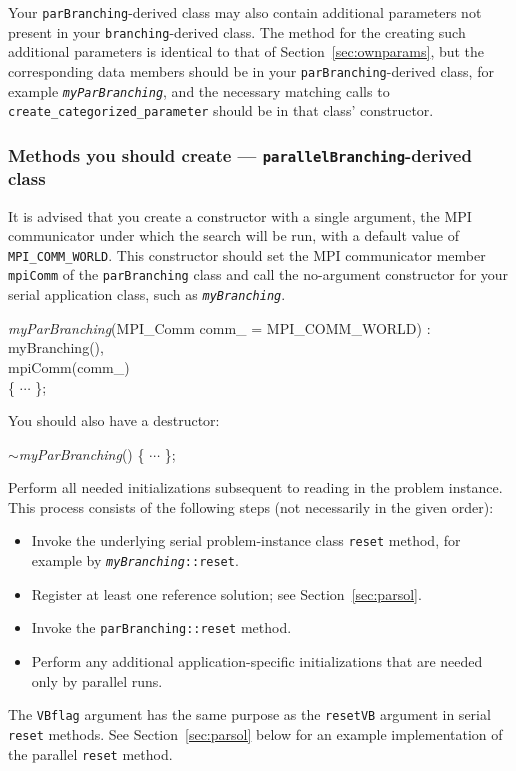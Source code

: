 Your \texttt{parBranching}-derived class may also contain additional
parameters not present in your \texttt{branching}-derived class.  The
method for the creating such additional parameters is identical to
that of
Section~\ref{sec:ownparams}, but the corresponding data members should
be in
your \texttt{parBranching}-derived class, for example
\texttt{\emph{myParBranching}}, and the necessary matching calls to
\texttt{create\_categorized\_parameter} should be in that class'
constructor. 


\subsubsection{Methods you should create ---
  \texttt{parallelBranching}-derived class}
\label{sec:pbDerived}
It is advised that you create a constructor with a single argument, the MPI
communicator under which the search will be run, with a default value of
\texttt{MPI\_COMM\_WORLD}.  This constructor should set the MPI communicator member \texttt{mpiComm} of the \texttt{parBranching} class and call the no-argument constructor for your serial application class, such as
\texttt{\emph{myBranching}}. 
\begin{codeblock}
\emph{myParBranching}(MPI\_Comm comm\_ = MPI\_COMM\_WORLD) : \\
myBranching(), \\
mpiComm(comm\_) \\
\{ $\cdots$ \}; 
\end{codeblock}

You should also have a destructor:
\begin{codeblock}
$\sim$\emph{myParBranching}() \{ $\cdots$ \}; \\
\end{codeblock}

Perform all needed initializations subsequent to reading in the
problem instance.  This process consists of the following steps (not
necessarily in the given order):
\begin{itemize}
\item Invoke the underlying serial problem-instance class
  \texttt{reset} method, for example by
  \texttt{\emph{myBranching}::reset}.
\item Register at least one reference solution; see
  Section~\ref{sec:parsol}.
\item Invoke the \texttt{parBranching::reset} method.
\item Perform any additional application-specific initializations that
  are needed only by parallel runs.
\end{itemize}
The \texttt{VBflag} argument has the same purpose as the
\texttt{resetVB} argument in serial \texttt{reset} methods.  See
Section~\ref{sec:parsol} below for an example implementation of the
parallel \texttt{reset} method.

